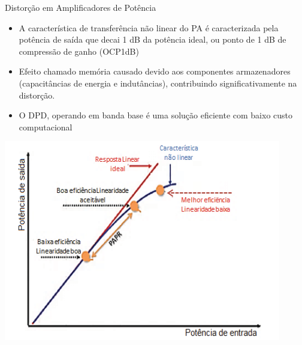 \documentclass{if-beamer}
\begin{document}
\begin{frame}{Distorção em Amplificadores de Potência}
	
	\begin{minipage}{.49\textwidth}
		
		\begin{itemize}
			\item A característica de transferência não linear do PA 
			é caracterizada pela potência de saída que decai 1 dB da potência ideal, ou ponto de 1 dB de compressão de ganho (OCP1dB)
			\item  Efeito chamado memória causado devido aos componentes armazenadores (capacitâncias de energia e indutâncias), contribuindo significativamente na distorção.
			\item  O DPD, operando em banda base é uma solução eficiente com baixo custo computacional
		
		\end{itemize}
		
		
	\end{minipage}
	\begin{minipage}{.49\textwidth}
		\includegraphics[scale=0.5]{curvasaidaparf.png}
	\end{minipage}
	
\end{frame}


\end{document}
